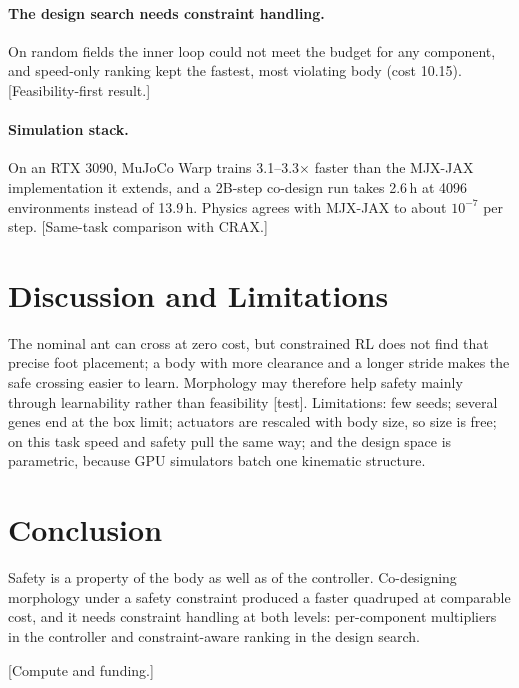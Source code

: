 \documentclass[sigconf,review]{acmart}
\newcommand{\TODO}[1]{\textcolor{red!70!black}{[#1]}}
\begin{document}
\paragraph{The design search needs constraint handling.} On random fields the inner loop could not meet the budget for any component, and speed-only ranking kept the fastest, most violating body (cost 10.15). \TODO{Feasibility-first result.}

\paragraph{Simulation stack.} On an RTX 3090, MuJoCo Warp trains 3.1--3.3$\times$ faster than the MJX-JAX implementation it extends, and a 2B-step co-design run takes 2.6\,h at 4096 environments instead of 13.9\,h. Physics agrees with MJX-JAX to about $10^{-7}$ per step. \TODO{Same-task comparison with CRAX.}

\section{Discussion and Limitations}
\label{sec:discussion}

The nominal ant can cross at zero cost, but constrained RL does not find that precise foot placement; a body with more clearance and a longer stride makes the safe crossing easier to learn. Morphology may therefore help safety mainly through learnability rather than feasibility \TODO{test}. Limitations: few seeds; several genes end at the box limit; actuators are rescaled with body size, so size is free; on this task speed and safety pull the same way; and the design space is parametric, because GPU simulators batch one kinematic structure.

\section{Conclusion}
\label{sec:conclusion}

Safety is a property of the body as well as of the controller. Co-designing morphology under a safety constraint produced a faster quadruped at comparable cost, and it needs constraint handling at both levels: per-component multipliers in the controller and constraint-aware ranking in the design search.

\begin{acks}
\TODO{Compute and funding.}
\end{acks}



\end{document}
